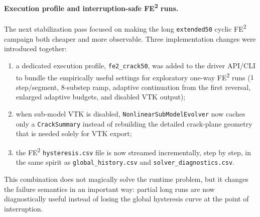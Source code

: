 \paragraph{Execution profile and interruption-safe FE\textsuperscript{2} runs.}
The next stabilization pass focused on making the long
\texttt{extended50} cyclic FE\textsuperscript{2} campaign both cheaper and
more observable.  Three implementation changes were introduced together:
\begin{enumerate}
  \item a dedicated execution profile, \texttt{fe2\_crack50}, was added to the
    driver API/CLI to bundle the empirically useful settings for exploratory
    one-way FE\textsuperscript{2} runs
    (\(1\) step/segment, 8-substep ramp, adaptive continuation from the first
    reversal, enlarged adaptive budgets, and disabled VTK output);
  \item when sub-model VTK is disabled, \texttt{NonlinearSubModelEvolver} now
    caches only a \texttt{CrackSummary} instead of rebuilding the detailed
    crack-plane geometry that is needed solely for VTK export;
  \item the FE\textsuperscript{2} \texttt{hysteresis.csv} file is now streamed
    incrementally, step by step, in the same spirit as
    \texttt{global\_history.csv} and \texttt{solver\_diagnostics.csv}.
\end{enumerate}

This combination does not magically solve the runtime problem, but it changes
the failure semantics in an important way: partial long runs are now
diagnostically useful instead of losing the global hysteresis curve at the
point of interruption.


